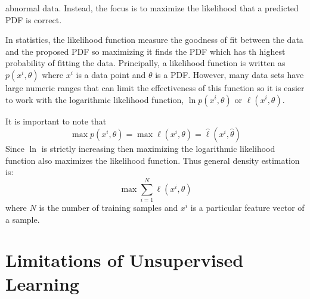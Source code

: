 \documentclass[10pt,a4paper]{report}
\begin{document}
					abnormal data. Instead, the focus is to maximize the likelihood that a predicted PDF is correct. \par
					In statistics, the likelihood function measure the goodness of fit between the data and the proposed PDF so maximizing it finds the PDF which
					has th highest probability of fitting the data.
					Principally, a likelihood function is written as $p(x^i,\theta)$ where $x^i$ is a data point and $\theta$ is a PDF.
					However, many data sets have large  numeric ranges that can limit the effectiveness of this function so it is easier to work with the
					logarithmic likelihood function, $\ln p(x^i,\theta)$ or $\ell(x^i,\theta)$. \par
					It is important to note that
					\begin{equation}
						\max p(x^i,\theta) = \max \ell(x^i,\theta) = \widehat{\ell}(x^i, \widehat{\theta})
					\end{equation}
					Since $\ln$ is strictly increasing then maximizing the logarithmic likelihood function also maximizes the likelihood function. Thus general density estimation \autocite[p. 4]{SurveyOfOptimizationMethods} is:
					\begin{equation}
						\max \sum_{i=1}^N \ell(x^i,\theta)
					\end{equation}
					where $N$ is the number of training samples and $x^i$ is a particular feature vector of a sample.

			\section{Limitations of Unsupervised Learning}
\end{document}
